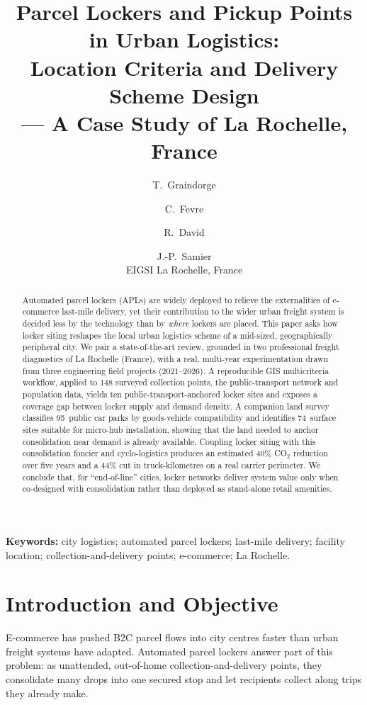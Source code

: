 \documentclass[10pt,a4paper,twocolumn]{article}
\title{\textbf{Parcel Lockers and Pickup Points in Urban Logistics:\\
Location Criteria and Delivery Scheme Design\\[-2pt]
--- A Case Study of La Rochelle, France}}
\author{T.~Graindorge \and C.~Fevre \and R.~David \and J.-P.~Samier\\
\small EIGSI La Rochelle, France}
\date{}
\begin{document}
\maketitle
\thispagestyle{empty}

\begin{abstract}
Automated parcel lockers (APLs) are widely deployed to relieve the externalities
of e-commerce last-mile delivery, yet their contribution to the wider urban freight
system is decided less by the technology than by \emph{where} lockers are placed.
This paper asks how locker siting reshapes the local urban logistics scheme of a
mid-sized, geographically peripheral city. We pair a state-of-the-art review,
grounded in two professional freight diagnostics of La Rochelle (France), with a
real, multi-year experimentation drawn from three engineering field projects
(2021--2026). A reproducible GIS multicriteria workflow, applied to 148 surveyed
collection points, the public-transport network and population data, yields ten
public-transport-anchored locker sites and exposes a coverage gap between locker
supply and demand density. A companion land survey classifies 95~public car parks
by goods-vehicle compatibility and identifies 74~surface sites suitable for
micro-hub installation, showing that the land needed to anchor consolidation near
demand is already available. Coupling locker siting with this consolidation
foncier and cyclo-logistics produces an estimated 40\% CO$_2$ reduction over five
years and a 44\% cut in truck-kilometres on a real carrier perimeter. We conclude
that, for ``end-of-line'' cities, locker networks deliver system value only when
co-designed with consolidation rather than deployed as stand-alone retail amenities.
\end{abstract}

\textbf{Keywords:} city logistics; automated parcel lockers; last-mile delivery;
facility location; collection-and-delivery points; e-commerce; La Rochelle.

\section{Introduction and Objective}

E-commerce has pushed B2C parcel flows into city centres faster than urban freight
systems have adapted. Automated parcel lockers answer part of this problem: as
unattended, out-of-home collection-and-delivery points, they consolidate many drops
into one secured stop and let recipients collect along trips they already make.
\end{document}
